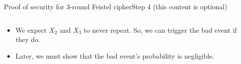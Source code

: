 \documentclass[aspectratio=169, lualatex, handout]{beamer}
\begin{document}
	\begin{frame}{Proof of security for 3-round Feistel cipher}{Step 4 (this content is optional)}
		\begin{columns}[c]
			\begin{column}{0.5\textwidth}
				\begin{itemize}
					\item We expect $X_2$ and $X_3$ to never repeat. So, we can trigger the bad event if they do.
					\item Later, we must show that the bad event's probability is negligible.
				\end{itemize}
			\end{column}
			\begin{column}{0.5\textwidth}
				\vspace{-1.5cm}
				\begin{center}
				\end{center}
			\end{column}
		\end{columns}
	\end{frame}
\end{document}
